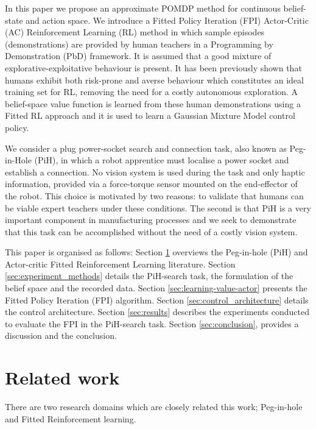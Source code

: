 \documentclass[final,5p,times,twocolumn]{elsarticle}
\begin{document}

In this paper we propose an approximate POMDP method for continuous belief-state and action space. We introduce a 
Fitted Policy Iteration (FPI) Actor-Critic (AC) Reinforcement Learning (RL) method in which sample episodes (demonstrations)
are provided by human teachers in a Programming by Demonstration (PbD) framework. It is assumed that 
a good mixture of explorative-exploitative behaviour is present.  It has been previously shown \cite{Chambrier2014} 
that humans exhibit both risk-prone and averse behaviour which constitutes an ideal training set for RL, 
removing the need for a costly autonomous exploration. A belief-space value function is learned from these 
human demonstrations using a Fitted RL approach and it is used to learn a Gaussian Mixture Model control policy.

We consider a plug power-socket search and connection task, also known as Peg-in-Hole (PiH), in which a 
robot apprentice must localise a power socket and establish a connection. 
No vision system is used during the task and only haptic information, provided via 
a force-torque sensor mounted on the end-effector of the robot. This choice is motivated by two reasons:
to validate that humans can be viable expert teachers under these conditions. The second is that PiH is a very important component 
in manufacturing processes and we seek to demonstrate that this task can be accomplished without the need of
a costly vision system.

This paper is organised as follows: Section \ref{sec:related_work} overviews the 
Peg-in-hole (PiH) and Actor-critic Fitted Reinforcement Learning literature. Section \ref{sec:experiment_methods} 
details the PiH-search task, the formulation of the belief space and the recorded data. Section \ref{sec:learning-value-actor} presents the Fitted Policy Iteration (FPI) algorithm.
Section \ref{sec:control_architecture} details the control architecture. Section \ref{sec:results} describes the experiments 
conducted to evaluate the FPI in the PiH-search task. Section \ref{sec:conclusion}, provides a discussion and the conclusion.


\section{Related work}\label{sec:related_work}

There are two research domains which are closely related this work;
Peg-in-hole and Fitted Reinforcement learning.
\end{document}
